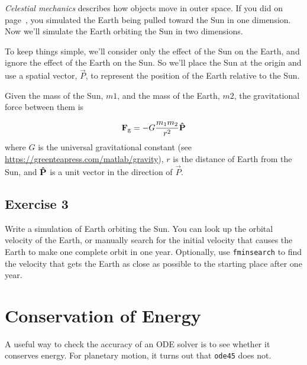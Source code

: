 \emph{Celestial mechanics} describes how objects move in outer space.
If you did \linebreak {} on page~\pageref{earth}, you simulated the Earth being pulled toward the Sun in one dimension.  Now we'll simulate the Earth orbiting the Sun in two dimensions.


To keep things simple, we'll consider only the effect of the Sun on the Earth, and ignore the effect of the Earth on the Sun.  So we'll place the Sun at the origin and use a spatial vector, $\vec{P}$, to represent the position of the Earth relative to the Sun.


Given the mass of the Sun, $m1$, and the mass of the Earth, $m2$, the gravitational force between them is

\begin{equation*}
\vec{F}_\mathrm{g} = -G \frac{m_1 m_2}{r^2} \uvec{P}
\end{equation*}
where $G$ is the universal gravitational constant (see \url{https://greenteapress.com/matlab/gravity}),
$r$ is the distance of Earth from the Sun, and
$\uvec{P}$ is a unit vector in the direction of $\vec{P}$.


\subsection{Exercise 3}
Write a simulation of Earth orbiting the Sun.  You can look up the orbital velocity of the Earth, or manually search for the initial velocity that causes the Earth to make one complete orbit in one year.  Optionally, use \lstinline{fminsearch} to find the velocity that gets the Earth as close as possible to the starting place after one year.



\section{Conservation of Energy}

A useful way to check the accuracy of an ODE solver is to see whether it conserves energy.  For planetary motion, it turns out that \lstinline{ode45} does not.

